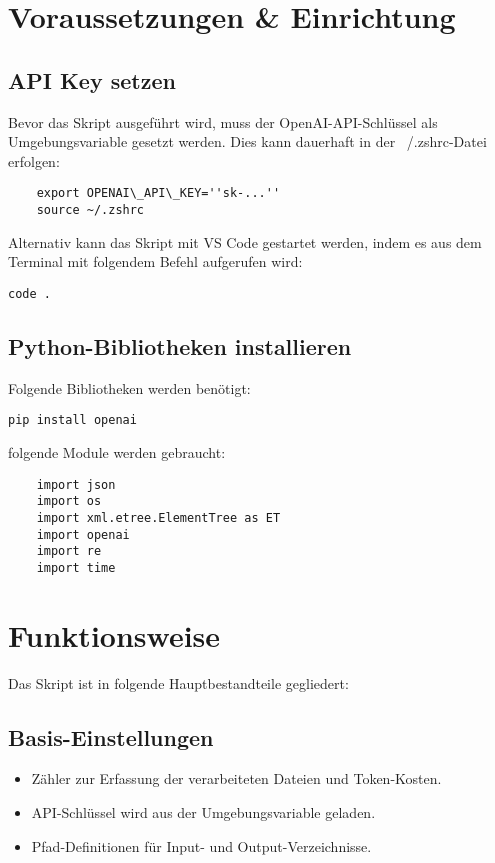 \documentclass{article}
\begin{document}
\section{Voraussetzungen \& Einrichtung}

\subsection{API Key setzen}
Bevor das Skript ausgeführt wird, muss der OpenAI-API-Schlüssel als Umgebungsvariable gesetzt werden. Dies kann dauerhaft in der ~/.zshrc-Datei erfolgen:

\begin{verbatim}
    export OPENAI\_API\_KEY=''sk-...''
    source ~/.zshrc
\end{verbatim}    

Alternativ kann das Skript mit VS Code gestartet werden, indem es aus dem Terminal mit folgendem Befehl aufgerufen wird:

\begin{verbatim}
code .
\end{verbatim}

\subsection{Python-Bibliotheken installieren}
Folgende Bibliotheken werden benötigt:

\begin{verbatim}
pip install openai
\end{verbatim}

folgende Module werden gebraucht:

\begin{verbatim}
    import json
    import os
    import xml.etree.ElementTree as ET
    import openai
    import re
    import time
\end{verbatim}

\section{Funktionsweise}

Das Skript ist in folgende Hauptbestandteile gegliedert:

\subsection{Basis-Einstellungen}
\begin{itemize}
\item Zähler zur Erfassung der verarbeiteten Dateien und Token-Kosten.
\item API-Schlüssel wird aus der Umgebungsvariable geladen.
\item Pfad-Definitionen für Input- und Output-Verzeichnisse.
\end{itemize}
\end{document}
